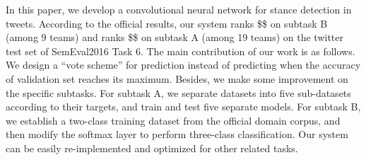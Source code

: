 In this paper, we develop a convolutional neural network for stance detection in tweets. According to the official results, our system ranks \$\$ on subtask B (among 9 teams) and ranks \$\$ on subtask A (among 19 teams) on the twitter test set of SemEval2016 Task 6. The main contribution of our work is as follows. We design a ``vote scheme'' for prediction instead of predicting when the accuracy of validation set reaches its maximum. Besides, we make some improvement on the specific subtasks. For subtask A, we separate datasets into five sub-datasets according to their targets, and train and test five separate models.  For subtask B, we establish a two-class training dataset from the official domain corpus, and then modify the softmax layer to perform three-class classification. Our system can be easily re-implemented and optimized for other related tasks.
